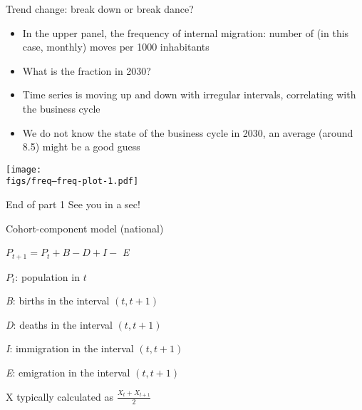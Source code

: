 \documentclass[final, 12pt, aspectratio=169, xcolor={dvipsnames}]{beamer}
\newcommand*{\figs}{../figs}%
\begin{document}
\begin{frame}{Trend change: break down or break dance?}
  \begin{minipage}[t]{0.48\linewidth}%
    \begin{itemize}
    \item In the upper panel, the frequency of internal migration: number of (in this case, monthly) moves per 1000 inhabitants
    \item What is the fraction in 2030?
    \item Time series is moving up and down with irregular intervals, correlating with the business cycle
      \item We do not know the state of the business cycle in 2030, an average (around 8.5) might be a good guess
      \end{itemize}
      
\end{minipage}%
\hfill%
\begin{minipage}[t]{0.48\linewidth}
  \vspace{-0.2cm}
  \centering
  \texttt{[image: \\figs/freq--freq-plot-1.pdf]}    
\end{minipage}    

\end{frame}

\begin{frame}{End of part 1}
  See you in a sec!
\end{frame}



\begin{frame}{Cohort-component model (national)}
  
    $P_{t+1} = P_{t} + B - D + I - $ \textit{E}
    
  \begin{description}
  \item \textit{$P_{t}$}: population in $t$ \\
  \item \textit{B}: births in the interval $(t, t+1 )$ \\
  \item \textit{D}: deaths in the interval $(t, t+1 )$ \\
  \item \textit{I}: immigration in the interval $(t, t+1 )$ \\
  \item \textit{E}: emigration in the interval $(t, t+1 )$
  \end{description}
\vspace{1cm}
  X typically calculated as $\frac{X_{t} + X_{t+1}}{2}$
  
\end{frame}
\end{document}
